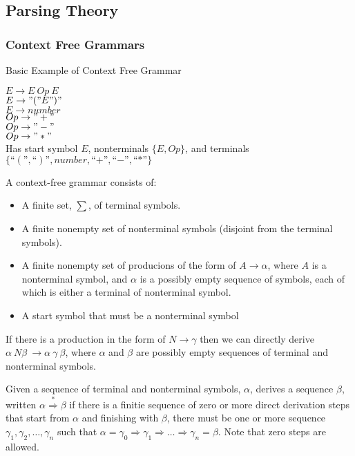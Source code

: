 \subsection{Parsing Theory}

\subsubsection{Context Free Grammars}

Basic Example of Context Free Grammar

$E \rightarrow E \ Op \ E $ \\
$E \rightarrow "(" E ")"$ \\
$E \rightarrow number$ \\
$Op \rightarrow "+"$ \\
$Op \rightarrow "-"$ \\
$Op \rightarrow "*"$ \\
Has start symbol $E$, nonterminals $\{E, Op\}$, and terminals
$\{“(”, “)”, number , “+”, “-”, “*”\}$

A context-free grammar consists of:
\begin{itemize}
\item A finite set, $\sum$,  of terminal symbols.
\item A finite nonempty set of nonterminal symbols (disjoint from the terminal symbols).
\item A finite nonempty set of producions of the form of $A \rightarrow \alpha$, where $A$ is a nonterminal symbol, and $\alpha$ is a possibly empty sequence of symbols, each of which is either a terminal of nonterminal symbol.
\item A start symbol that must be a nonterminal symbol
\end{itemize}

If there is a production in the form of $N \rightarrow \gamma$ then we can directly derive $\alpha \ N \beta \ \rightarrow \alpha \ \gamma \ \beta$, where $\alpha$ and $\beta$ are possibly empty sequences of terminal and nonterminal symbols.

Given a sequence of terminal and nonterminal symbols, $\alpha$, derives a sequence $\beta$, written $\alpha \stackrel{*}{\Rightarrow} \beta$ if there is a finitie sequence of zero or more direct derivation steps that start from $\alpha$ and finishing with $\beta$, there must be one or more sequence $\gamma_1, \gamma_2, \ldots, \gamma_n$ such that $\alpha = \gamma_0 \Rightarrow \gamma_1 \Rightarrow \ldots \Rightarrow \gamma_n = \beta$. Note that zero steps are allowed.


